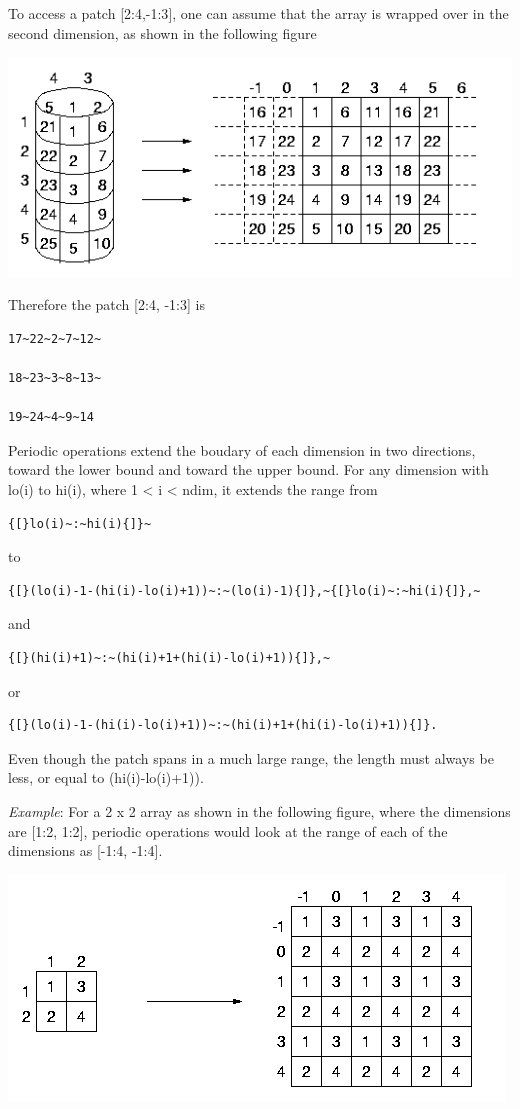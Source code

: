 To access a patch {[}2:4,-1:3{]}, one can assume that the array is
wrapped over in the second dimension, as shown in the following figure 

\includegraphics[scale=0.7]{periodic2}

Therefore the patch {[}2:4, -1:3{]} is
\begin{verbatim}
17~22~2~7~12~

18~23~3~8~13~

19~24~4~9~14
\end{verbatim}
Periodic operations extend the boudary of each dimension in two directions,
toward the lower bound and toward the upper bound. For any dimension
with lo(i) to hi(i), where 1 < i < ndim, it extends the range from 
\begin{verbatim}
{[}lo(i)~:~hi(i){]}~
\end{verbatim}
to 
\begin{verbatim}
{[}(lo(i)-1-(hi(i)-lo(i)+1))~:~(lo(i)-1){]},~{[}lo(i)~:~hi(i){]},~
\end{verbatim}
and 
\begin{verbatim}
{[}(hi(i)+1)~:~(hi(i)+1+(hi(i)-lo(i)+1)){]},~
\end{verbatim}
or 
\begin{verbatim}
{[}(lo(i)-1-(hi(i)-lo(i)+1))~:~(hi(i)+1+(hi(i)-lo(i)+1)){]}.
\end{verbatim}
Even though the patch spans in a much large range, the length must
always be less, or equal to (hi(i)-lo(i)+1)).

\emph{Example}: For a 2 x 2 array as shown in the following figure,
where the dimensions are {[}1:2, 1:2{]}, periodic operations would
look at the range of each of the dimensions as {[}-1:4, -1:4{]}.

\includegraphics[scale=0.7]{periodic3}

